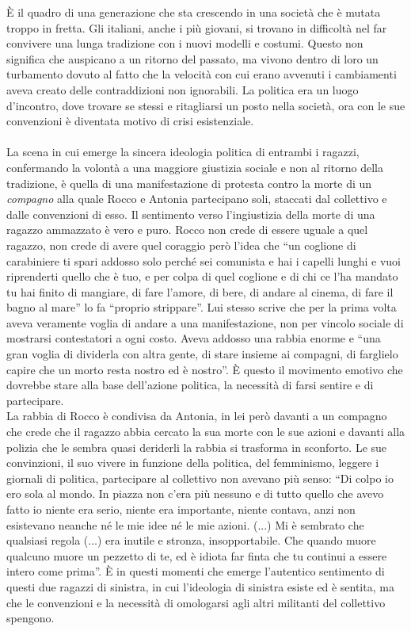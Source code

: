 È il quadro di una generazione che sta crescendo in una società che è mutata troppo in fretta.
Gli italiani, anche i più giovani, si trovano in difficoltà nel far convivere una lunga tradizione con i nuovi modelli e costumi.
Questo non significa che auspicano a un ritorno del passato, ma vivono dentro di loro un turbamento dovuto al fatto che la velocità con cui erano avvenuti i cambiamenti aveva creato delle contraddizioni non ignorabili.
La politica era un luogo d'incontro, dove trovare se stessi e ritagliarsi un posto nella società, ora con le sue convenzioni è diventata motivo di crisi esistenziale.

\paragraph{}La scena in cui emerge la sincera ideologia politica di entrambi i ragazzi, confermando la volontà a una maggiore giustizia sociale e non al ritorno della tradizione, è quella di una manifestazione di protesta contro la morte di un \textit{compagno} alla quale Rocco e Antonia partecipano soli, staccati dal collettivo e dalle convenzioni di esso.
Il sentimento verso l'ingiustizia della morte di una ragazzo ammazzato è vero e puro.
Rocco non crede di essere uguale a quel ragazzo, non crede di avere quel coraggio però l'idea che \enquote{un coglione di carabiniere ti spari addosso solo perché sei comunista e hai i capelli lunghi e vuoi riprenderti quello che è tuo, e per colpa di quel coglione e di chi ce l'ha mandato tu hai finito di mangiare, di fare l'amore, di bere, di andare al cinema, di fare il bagno al mare} lo fa \enquote{proprio strippare}.
Lui stesso scrive che per la prima volta aveva veramente voglia di andare a una manifestazione, non per vincolo sociale di mostrarsi contestatori a ogni costo.
Aveva addosso una rabbia enorme e \enquote{una gran voglia di dividerla con altra gente, di stare insieme ai compagni, di farglielo capire che un morto resta nostro ed è nostro}.
È questo il movimento emotivo che dovrebbe stare alla base dell'azione politica, la necessità di farsi sentire e di partecipare.
\\La rabbia di Rocco è condivisa da Antonia, in lei però davanti a un compagno che crede che il ragazzo abbia cercato la sua morte con le sue azioni e davanti alla polizia che le sembra quasi deriderli la rabbia si trasforma in sconforto.
Le sue convinzioni, il suo vivere in funzione della politica, del femminismo, leggere i giornali di politica, partecipare al collettivo non avevano più senso: \enquote{Di colpo io ero sola al mondo. In piazza non c'era più nessuno e di tutto quello che avevo fatto io niente era serio, niente era importante, niente contava, anzi non esistevano neanche né le mie idee né le mie azioni. (...) Mi è sembrato che qualsiasi regola (...) era inutile e stronza, insopportabile. Che quando muore qualcuno muore un pezzetto di te, ed è idiota far finta che tu continui a essere intero come prima}.
È in questi momenti che emerge l'autentico sentimento di questi due ragazzi di sinistra, in cui l'ideologia di sinistra esiste ed è sentita, ma che le convenzioni e la necessità di omologarsi agli altri militanti del collettivo spengono.

